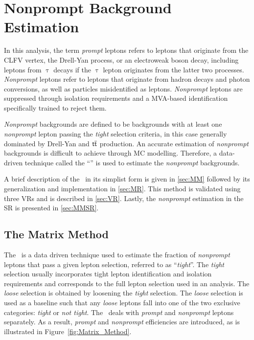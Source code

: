 \chapter{Nonprompt Background Estimation}
\label{chap:Nonprompt}

In this analysis, the term \emph{prompt} leptons refers to leptons that originate from the \ac{CLFV} vertex, the Drell-Yan process, or an electroweak boson decay, including leptons from $\uptau$ decays if the $\uptau$ lepton originates from the latter two processes. \emph{Nonprompt} leptons refer to leptons that originate from hadron decays and photon conversions, as well as particles misidentified as leptons. \emph{Nonprompt} leptons are suppressed through isolation requirements and a \ac{MVA}-based identification specifically trained to reject them.

\emph{Nonprompt} backgrounds are defined to be backgrounds with at least one \emph{nonprompt} lepton passing the \emph{tight} selection criteria, in this case generally dominated by Drell-Yan and $\textsf{t}\overline{\textsf{t}}$ production. An accurate estimation of \emph{nonprompt} backgrounds is difficult to achieve through \ac{MC} modelling. Therefore, a data-driven technique called the ``\mm'' \cite{Gillam:2014xua} is used to estimate the \emph{nonprompt} backgrounds. 

A brief description of the \mm~in its simplist form is given in \autoref{sec:MM} followed by its generalization and implementation in \autoref{sec:MR}. This method is validated using three \acp{VR} and is described in \autoref{sec:VR}. Lastly, the \emph{nonprompt} estimation in the \ac{SR} is presented in \autoref{sec:MMSR}.

\section{The Matrix Method}
\label{sec:MM}

The \mm~is a data driven technique used to estimate the fraction of \emph{nonprompt} leptons that pass a given lepton selection, referred to as ``\emph{tight}''. The \emph{tight} selection usually incorporates tight lepton identification and isolation requirements and corresponds to the full lepton selection used in an analysis. The \emph{loose} selection is obtained by loosening the \emph{tight} selection. The \emph{loose} selection is used as a baseline such that any \emph{loose} leptons fall into one of the two exclusive categories: \emph{tight} or \emph{not tight}. The \mm~deals with  \emph{prompt} and \emph{nonprompt} leptons separately. As a result, \emph{prompt} and \emph{nonprompt} efficiencies are introduced, as is illustrated in Figure~\ref{fig:Matrix_Method}.

